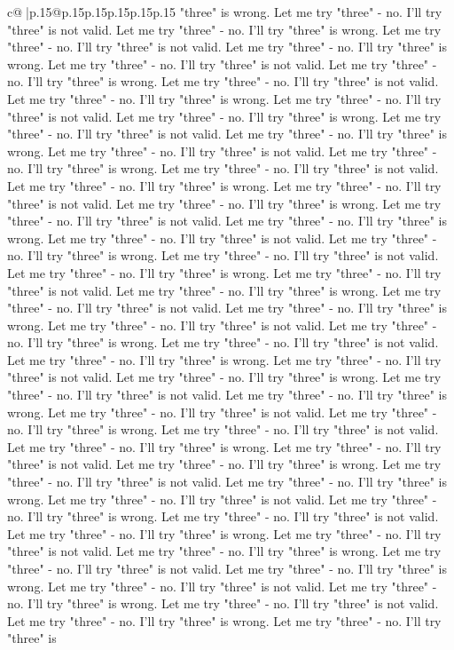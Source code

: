 \documentclass{article}
\begin{document}
{\begin{supertabular}{c@{$\;$}|p{.15\linewidth}@{}p{.15\linewidth}p{.15\linewidth}p{.15\linewidth}p{.15\linewidth}p{.15\linewidth}}
{{{"three" is wrong. Let me try "three" {-} no. I'll try "three" is not valid. Let me try "three" {-} no. I'll try "three" is wrong. Let me try "three" {-} no. I'll try "three" is not valid. Let me try "three" {-} no. I'll try "three" is wrong. Let me try "three" {-} no. I'll try "three" is not valid. Let me try "three" {-} no. I'll try "three" is wrong. Let me try "three" {-} no. I'll try "three" is not valid. Let me try "three" {-} no. I'll try "three" is wrong. Let me try "three" {-} no. I'll try "three" is not valid. Let me try "three" {-} no. I'll try "three" is wrong. Let me try "three" {-} no. I'll try "three" is not valid. Let me try "three" {-} no. I'll try "three" is wrong. Let me try "three" {-} no. I'll try "three" is not valid. Let me try "three" {-} no. I'll try "three" is wrong. Let me try "three" {-} no. I'll try "three" is not valid. Let me try "three" {-} no. I'll try "three" is wrong. Let me try "three" {-} no. I'll try "three" is not valid. Let me try "three" {-} no. I'll try "three" is wrong. Let me try "three" {-} no. I'll try "three" is not valid. Let me try "three" {-} no. I'll try "three" is wrong. Let me try "three" {-} no. I'll try "three" is not valid. Let me try "three" {-} no. I'll try "three" is wrong. Let me try "three" {-} no. I'll try "three" is not valid. Let me try "three" {-} no. I'll try "three" is wrong. Let me try "three" {-} no. I'll try "three" is not valid. Let me try "three" {-} no. I'll try "three" is wrong. Let me try "three" {-} no. I'll try "three" is not valid. Let me try "three" {-} no. I'll try "three" is wrong. Let me try "three" {-} no. I'll try "three" is not valid. Let me try "three" {-} no. I'll try "three" is wrong. Let me try "three" {-} no. I'll try "three" is not valid. Let me try "three" {-} no. I'll try "three" is wrong. Let me try "three" {-} no. I'll try "three" is not valid. Let me try "three" {-} no. I'll try "three" is wrong. Let me try "three" {-} no. I'll try "three" is not valid. Let me try "three" {-} no. I'll try "three" is wrong. Let me try "three" {-} no. I'll try "three" is not valid. Let me try "three" {-} no. I'll try "three" is wrong. Let me try "three" {-} no. I'll try "three" is not valid. Let me try "three" {-} no. I'll try "three" is wrong. Let me try "three" {-} no. I'll try "three" is not valid. Let me try "three" {-} no. I'll try "three" is wrong. Let me try "three" {-} no. I'll try "three" is not valid. Let me try "three" {-} no. I'll try "three" is wrong. Let me try "three" {-} no. I'll try "three" is not valid. Let me try "three" {-} no. I'll try "three" is wrong. Let me try "three" {-} no. I'll try "three" is not valid. Let me try "three" {-} no. I'll try "three" is wrong. Let me try "three" {-} no. I'll try "three" is not valid. Let me try "three" {-} no. I'll try "three" is wrong. Let me try "three" {-} no. I'll try "three" is not valid. Let me try "three" {-} no. I'll try "three" is wrong. Let me try "three" {-} no. I'll try "three" is not valid. Let me try "three" {-} no. I'll try "three" is wrong. Let me try "three" {-} no. I'll try "three" is not valid. Let me try "three" {-} no. I'll try "three" is wrong. Let me try "three" {-} no. I'll try "three" is }}}
\end{supertabular}}
\end{document}
